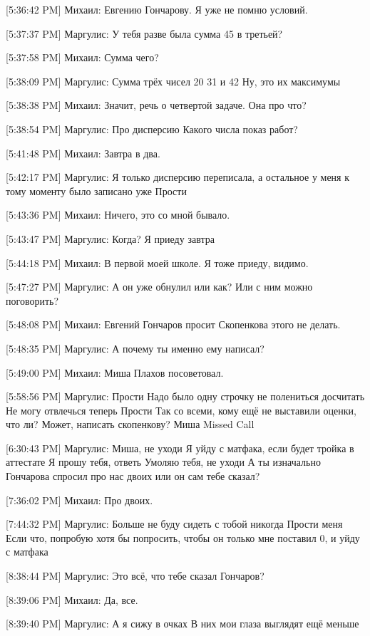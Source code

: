 \documentclass{article}
\begin{document}
[5:36:42 PM] Михаил:
Евгению Гончарову.
 Я уже не помню условий.

[5:37:37 PM] Маргулис:
У тебя разве была сумма 45 в третьей?

[5:37:58 PM] Михаил:
Сумма чего?

[5:38:09 PM] Маргулис:
Сумма трёх чисел
 20 31 и 42
 Ну, это их максимумы

[5:38:38 PM] Михаил:
Значит, речь о четвертой задаче.
 Она про что?

[5:38:54 PM] Маргулис:
Про дисперсию
 Какого числа показ работ?

[5:41:48 PM] Михаил:
Завтра в два.

[5:42:17 PM] Маргулис:
Я только дисперсию переписала, а остальное у меня к тому моменту было записано уже
 Прости

[5:43:36 PM] Михаил:
Ничего, это со мной бывало.

[5:43:47 PM] Маргулис:
Когда?
 Я приеду завтра

[5:44:18 PM] Михаил:
В первой моей школе. Я тоже приеду, видимо.

[5:47:27 PM] Маргулис:
А он уже обнулил или как?
 Или с ним можно поговорить?

[5:48:08 PM] Михаил:
Евгений Гончаров просит Скопенкова этого не делать.

[5:48:35 PM] Маргулис:
А почему ты именно ему написал?

[5:49:00 PM] Михаил:
Миша Плахов посоветовал.

[5:58:56 PM] Маргулис:
Прости
 Надо было одну строчку не полениться досчитать
 Не могу отвлечься теперь
 Прости
 Так со всеми, кому ещё не выставили оценки, что ли?
 Может, написать скопенкову?
 Миша
Missed Call

[6:30:43 PM] Маргулис:
Миша, не уходи
 Я уйду с матфака, если будет тройка в аттестате
 Я прошу тебя, ответь
 Умоляю тебя, не уходи
 А ты изначально Гончарова спросил про нас двоих или он сам тебе сказал?

[7:36:02 PM] Михаил:
Про двоих.

[7:44:32 PM] Маргулис:
Больше не буду сидеть с тобой никогда
 Прости меня
 Если что, попробую хотя бы попросить, чтобы он только мне поставил 0, и уйду с матфака

[8:38:44 PM] Маргулис:
Это всё, что тебе сказал Гончаров?

[8:39:06 PM] Михаил:
Да, все.

[8:39:40 PM] Маргулис:
А я сижу в очках
 В них мои глаза выглядят ещё меньше
\end{document}

